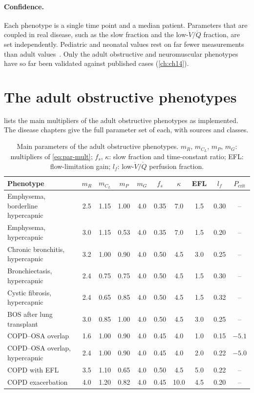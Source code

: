 \paragraph{Confidence.} Each phenotype is a single time point and a median patient. Parameters that are coupled in real disease, such as the slow fraction and the low-$\dot V/\dot Q$ fraction, are set independently. Pediatric and neonatal values rest on far fewer measurements than adult values~\citep{papastamelos1995,davis1987,muller1979}. Only the adult obstructive and neuromuscular phenotypes have so far been validated against published cases (\cref{ch:ch14}).



\section{The adult obstructive phenotypes}
\label{sec:par-obst}
 lists the main multipliers of the adult obstructive phenotypes as implemented. The disease chapters give the full parameter set of each, with sources and classes.

\begin{table}[ht]
\centering
\caption{Main parameters of the adult obstructive phenotypes. $m_R$, $m_{C_L}$, $m_P$, $m_G$: multipliers of \cref{eq:par-mult}; $f_s$, $\kappa$: slow fraction and time-constant ratio; EFL: flow-limitation gain; $l_f$: low-$\dot V/\dot Q$ perfusion fraction.}
\label{tab:par-obst}
\small
\begin{tabular}{@{}lccccccccc@{}}
\toprule
Phenotype & $m_R$ & $m_{C_L}$ & $m_P$ & $m_G$ & $f_s$ & $\kappa$ & EFL & $l_f$ & $P_{\mathrm{crit}}$ \\
\midrule
Emphysema, borderline hypercapnic & 2.5 & 1.15 & 1.00 & 4.0 & 0.35 & 7.0 & 1.5 & 0.30 & -- \\
Emphysema, hypercapnic & 3.0 & 1.15 & 0.53 & 4.0 & 0.35 & 7.0 & 1.5 & 0.20 & -- \\
Chronic bronchitis, hypercapnic & 3.2 & 1.00 & 0.90 & 4.0 & 0.50 & 4.5 & 3.0 & 0.25 & -- \\
Bronchiectasis, hypercapnic & 2.4 & 0.75 & 0.75 & 4.0 & 0.50 & 4.5 & 1.5 & 0.30 & -- \\
Cystic fibrosis, hypercapnic & 2.4 & 0.65 & 0.85 & 4.0 & 0.50 & 4.5 & 1.5 & 0.32 & -- \\
BOS after lung transplant & 3.0 & 0.85 & 1.00 & 4.0 & 0.50 & 4.5 & 3.0 & 0.25 & -- \\
COPD--OSA overlap & 1.6 & 1.00 & 0.90 & 4.0 & 0.45 & 4.0 & 1.0 & 0.15 & $-5.1$ \\
COPD--OSA overlap, hypercapnic & 2.4 & 1.00 & 0.90 & 4.0 & 0.45 & 4.0 & 2.0 & 0.22 & $-5.0$ \\
COPD with EFL & 3.5 & 1.10 & 0.65 & 4.0 & 0.50 & 4.5 & 5.0 & 0.22 & -- \\
COPD exacerbation & 4.0 & 1.20 & 0.82 & 4.0 & 0.45 & 10.0 & 4.5 & 0.20 & -- \\
\bottomrule
\end{tabular}
\end{table}

